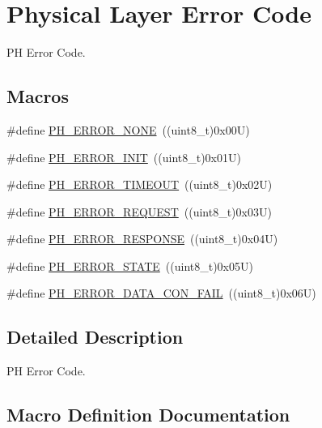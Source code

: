 \hypertarget{group___p_h___error___code}{}\section{Physical Layer Error Code}
\label{group___p_h___error___code}


PH Error Code.  


\subsection*{Macros}
\begin{DoxyCompactItemize}
\item 
\#define \hyperlink{group___p_h___error___code_ga67055c114ec03135c28e1cb6a3d68f5a}{P\+H\+\_\+\+E\+R\+R\+O\+R\+\_\+\+N\+O\+NE}~((uint8\+\_\+t)0x00\+U)
\item 
\#define \hyperlink{group___p_h___error___code_ga15fbdf4edfc98283ef0f1b7c2fc0a47b}{P\+H\+\_\+\+E\+R\+R\+O\+R\+\_\+\+I\+N\+IT}~((uint8\+\_\+t)0x01\+U)
\item 
\#define \hyperlink{group___p_h___error___code_gaae8d2172a18fdde6957c77af378c2574}{P\+H\+\_\+\+E\+R\+R\+O\+R\+\_\+\+T\+I\+M\+E\+O\+UT}~((uint8\+\_\+t)0x02\+U)
\item 
\#define \hyperlink{group___p_h___error___code_ga76393e5665e76130e95c73aab378c53d}{P\+H\+\_\+\+E\+R\+R\+O\+R\+\_\+\+R\+E\+Q\+U\+E\+ST}~((uint8\+\_\+t)0x03\+U)
\item 
\#define \hyperlink{group___p_h___error___code_ga104872de885107db19b579c81a62f563}{P\+H\+\_\+\+E\+R\+R\+O\+R\+\_\+\+R\+E\+S\+P\+O\+N\+SE}~((uint8\+\_\+t)0x04\+U)
\item 
\#define \hyperlink{group___p_h___error___code_ga495ce5ac265432fc88f35462ea1515f8}{P\+H\+\_\+\+E\+R\+R\+O\+R\+\_\+\+S\+T\+A\+TE}~((uint8\+\_\+t)0x05\+U)
\item 
\#define \hyperlink{group___p_h___error___code_gaddc21322438e03e6789aacba1aeb75c2}{P\+H\+\_\+\+E\+R\+R\+O\+R\+\_\+\+D\+A\+T\+A\+\_\+\+C\+O\+N\+\_\+\+F\+A\+IL}~((uint8\+\_\+t)0x06\+U)
\end{DoxyCompactItemize}


\subsection{Detailed Description}
PH Error Code. 



\subsection{Macro Definition Documentation}
